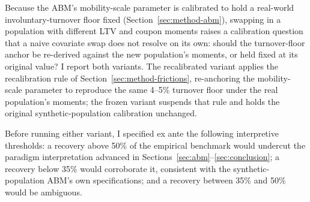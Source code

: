 \documentclass[12pt]{article}
\begin{document}
Because the ABM's mobility-scale parameter is calibrated to hold a real-world involuntary-turnover floor fixed (Section~\ref{sec:method-abm}), swapping in a population with different LTV and coupon moments raises a calibration question that a naive covariate swap does not resolve on its own: should the turnover-floor anchor be re-derived against the new population's moments, or held fixed at its original value? I report both variants. The recalibrated variant applies the recalibration rule of Section~\ref{sec:method-frictions}, re-anchoring the mobility-scale parameter to reproduce the same 4--5\% turnover floor under the real population's moments; the frozen variant suspends that rule and holds the original synthetic-population calibration unchanged.

Before running either variant, I specified ex ante the following interpretive thresholds: a recovery above 50\% of the empirical benchmark would undercut the paradigm interpretation advanced in Sections~\ref{sec:abm}--\ref{sec:conclusion}; a recovery below 35\% would corroborate it, consistent with the synthetic-population ABM's own specifications; and a recovery between 35\% and 50\% would be ambiguous.
\end{document}
